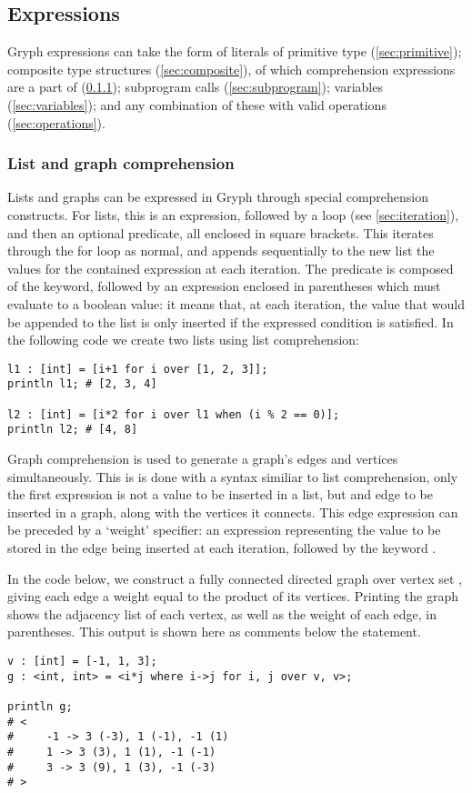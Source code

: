 \subsection{Expressions}
\label{sec:expressions}
Gryph expressions can take the form of literals of primitive type (\ref{sec:primitive}); composite type structures (\ref{sec:composite}), of which comprehension expressions are a part of (\ref{sec:comprehension}); subprogram calls (\ref{sec:subprogram}); variables (\ref{sec:variables}); and any combination of these with valid operations (\ref{sec:operations}).

\subsubsection{List and graph comprehension}
\label{sec:comprehension}
Lists and graphs can be expressed in Gryph through special comprehension constructs. For lists, this is an expression, followed by a  loop (see \ref{sec:iteration}), and then an optional predicate, all enclosed in square brackets. This iterates through the for loop as normal, and appends sequentially to the new list the values for the contained expression at each iteration. The predicate is composed of the  keyword, followed by an expression enclosed in parentheses which must evaluate to a boolean value: it means that, at each iteration, the value that would be appended to the list is only inserted if the expressed condition is satisfied.
In the following code we create two lists using list comprehension:
\begin{lstlisting}[language=Gryph]
l1 : [int] = [i+1 for i over [1, 2, 3]];
println l1; # [2, 3, 4]

l2 : [int] = [i*2 for i over l1 when (i % 2 == 0)];
println l2; # [4, 8]
\end{lstlisting}

Graph comprehension is used to generate a graph's edges and vertices simultaneously. This is is done with a syntax similiar to list comprehension, only the first expression is not a value to be inserted in a list, but and edge to be inserted in a graph, along with the vertices it connects. This edge expression can be preceded by a `weight' specifier: an expression representing the value to be stored in the edge being inserted at each iteration, followed by the keyword .

In the code below, we construct a fully connected directed graph over vertex set , giving each edge a weight equal to the product of its vertices. Printing the graph shows the adjacency list of each vertex, as well as the weight of each edge, in parentheses. This output is shown here as comments below the  statement.
\begin{lstlisting}[language=Gryph]
v : [int] = [-1, 1, 3];
g : <int, int> = <i*j where i->j for i, j over v, v>;

println g;
# <
#     -1 -> 3 (-3), 1 (-1), -1 (1)
#     1 -> 3 (3), 1 (1), -1 (-1)
#     3 -> 3 (9), 1 (3), -1 (-3)
# >
\end{lstlisting}

